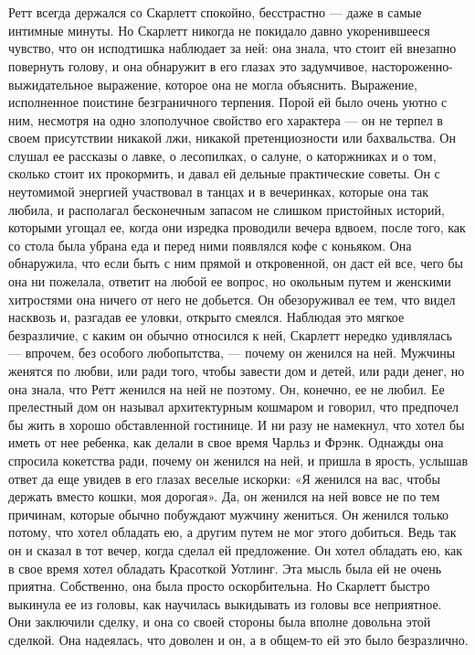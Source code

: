 \chapter{\ }

Ретт всегда держался со Скарлетт спокойно, бесстрастно — даже в самые интимные минуты. Но Скарлетт никогда не покидало давно укоренившееся чувство, что он исподтишка наблюдает за ней: она знала, что стоит ей внезапно повернуть голову, и она обнаружит в его глазах это задумчивое, настороженно-выжидательное выражение, которое она не могла объяснить. Выражение, исполненное поистине безграничного терпения.
Порой ей было очень уютно с ним, несмотря на одно злополучное свойство его характера — он не терпел в своем присутствии никакой лжи, никакой претенциозности или бахвальства. Он слушал ее рассказы о лавке, о лесопилках, о салуне, о каторжниках и о том, сколько стоит их прокормить, и давал ей дельные практические советы. Он с неутомимой энергией участвовал в танцах и в вечеринках, которые она так любила, и располагал бесконечным запасом не слишком пристойных историй, которыми угощал ее, когда они изредка проводили вечера вдвоем, после того, как со стола была убрана еда и перед ними появлялся кофе с коньяком. Она обнаружила, что если быть с ним прямой и откровенной, он даст ей все, чего бы она ни пожелала, ответит на любой ее вопрос, но окольным путем и женскими хитростями она ничего от него не добьется. Он обезоруживал ее тем, что видел насквозь и, разгадав ее уловки, открыто смеялся.
Наблюдая это мягкое безразличие, с каким он обычно относился к ней, Скарлетт нередко удивлялась — впрочем, без особого любопытства, — почему он женился на ней. Мужчины женятся по любви, или ради того, чтобы завести дом и детей, или ради денег, но она знала, что Ретт женился на ней не поэтому. Он, конечно, ее не любил. Ее прелестный дом он называл архитектурным кошмаром и говорил, что предпочел бы жить в хорошо обставленной гостинице. И ни разу не намекнул, что хотел бы иметь от нее ребенка, как делали в свое время Чарльз и Фрэнк. Однажды она спросила кокетства ради, почему он женился на ней, и пришла в ярость, услышав ответ да еще увидев в его глазах веселые искорки: «Я женился на вас, чтобы держать вместо кошки, моя дорогая».
Да, он женился на ней вовсе не по тем причинам, которые обычно побуждают мужчину жениться. Он женился только потому, что хотел обладать ею, а другим путем не мог этого добиться. Ведь так он и сказал в тот вечер, когда сделал ей предложение. Он хотел обладать ею, как в свое время хотел обладать Красоткой Уотлинг. Эта мысль была ей не очень приятна. Собственно, она была просто оскорбительна. Но Скарлетт быстро выкинула ее из головы, как научилась выкидывать из головы все неприятное. Они заключили сделку, и она со своей стороны была вполне довольна этой сделкой. Она надеялась, что доволен и он, а в общем-то ей это было безразлично.
